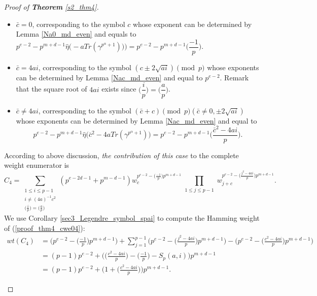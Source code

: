 \documentclass[final,1p,times]{elsarticle}
\begin{document}
\begin{proof}[Proof of \textbf{Theorem} \ref{s2_thm4}]
\begin{enumerate}[(I)]
\begin{itemize}
\item $ \bar{c}=0 $, corresponding to the symbol $ c $ whose exponent can be determined by Lemma \ref{Na0_md_even} and equals to $ p^{e-2}-p^{m+d-1}\widehat{\eta}\bigl(-aTr(\gamma^{p^{\alpha}+1}))\bigr)=p^{e-2}-p^{m+d-1}\biggl(\dfrac{-1}{p}\biggr) $.
\item $ \bar{c}=4ai $, corresponding to the symbol $ (c\pm 2\sqrt{ai})\pmod p $ whose exponents can be determined by Lemma \ref{Nac_md_even} and equal to $ p^{e-2} $. Remark that the square root of $ 4ai $ exists since $ \biggl(\dfrac{i}{p}\biggr)=\biggl(\dfrac{a}{p}\biggr) $.
\item $ \bar{c}\ne 4ai $, corresponding to the symbol $ (\bar{c}+c)\pmod p (\bar{c}\ne 0,\pm 2\sqrt{ai})$ whose exponents can be determined by Lemma \ref{Nac_md_even} and equal to 
\begin{equation*}
p^{e-2}-p^{m+d-1}\widehat{\eta}\bigl(\bar{c}^{2}-4aTr(\gamma^{p^{\alpha}+1})\bigr)=
p^{e-2}-p^{m+d-1}\biggl(\dfrac{\bar{c}^{2}-4ai}{p}\biggr).
\end{equation*}
\end{itemize}
According to above discussion, \textit{the contribution of this case} to the complete weight enumerator is
\begin{equation}\label{proof_thm4_cwe04}
C_{4}=\sum_{\substack{1\leq i\leq p-1\\i\ne (4a)^{-1}c^{2}\\\bigl(\frac{i}{p}\bigr)=\bigl(\frac{a}{p}\bigr)}}(p^{e-2d-1}+p^{m-d-1})w_{c}^{p^{e-2}-\bigl(\frac{-1}{p}\bigr)p^{m+d-1}}\prod_{\substack{1\leq j\leq p-1}}w_{j+c}^{p^{e-2}-\bigl(\frac{j^{2}-4ai}{p}\bigr)p^{m+d-1}}.
\end{equation}
We use Corollary \ref{sec3_Legendre_symbol_spai} to compute the Hamming weight of (\ref{proof_thm4_cwe04}):
\begin{equation*}
\begin{split}
wt(C_{4})&=\biggl(p^{e-2}-\biggl(\frac{-1}{p}\biggr)p^{m+d-1}\biggr)+\sum_{j=1}^{p-1}\biggl(p^{e-2}-\biggl(\frac{j^{2}-4ai}{p}\biggr)p^{m+d-1}\biggr)-\biggl(p^{e-2}-\biggl(\frac{c^{2}-4ai}{p}\biggr)p^{m+d-1}\biggr)\\
&=(p-1)p^{e-2}+\biggl(\biggl(\frac{c^{2}-4ai}{p}\biggr)-\biggl(\frac{-1}{p}\biggr)-S_{p}(a,i)\biggr)p^{m+d-1}\\
&=(p-1)p^{e-2}+\biggl(1+\biggl(\frac{c^{2}-4ai}{p}\biggr)\biggr)p^{m+d-1}.

\end{split}
\end{equation*}
\end{enumerate}
\end{proof}
\end{document}
